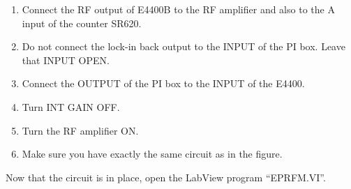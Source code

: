 {\begin{enumerate}
\item Connect the RF output of E4400B to the RF amplifier and also to the A 
input of the counter SR620.

\item Do not connect the lock-in back output to the INPUT of the PI box. Leave that INPUT OPEN.

\item Connect the OUTPUT of the PI box to the INPUT of the E4400.

\item Turn INT GAIN OFF.

\item Turn the RF amplifier ON.

\item Make sure you have exactly the same circuit as in the figure.

\end{enumerate}


Now that the circuit is in place, open the LabView program
``EPRFM.VI''.

\begin{enumerate}


\end{enumerate}}
